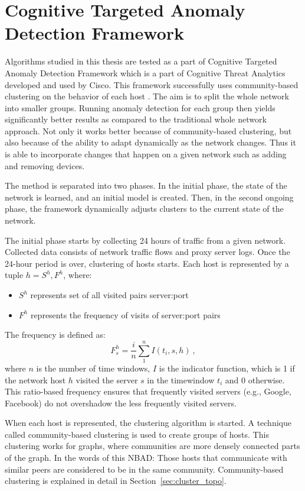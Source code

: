 \documentclass[thesis=B,english]{FITthesis}[2012/10/20]
\begin{document}
\section{Cognitive Targeted Anomaly Detection Framework}\label{sec:ctadf}

Algorithms studied in this thesis are tested as a part of Cognitive Targeted Anomaly Detection Framework which is a part of Cognitive Threat Analytics developed and used by Cisco.
This framework successfully uses community-based clustering on the behavior of each host \cite{kopp2018community}.
The aim is to split the whole network into smaller groups.
Running anomaly detection for each group then yields significantly better results as compared to the traditional whole network approach.
Not only it works better because of community-based clustering, but also because of the ability to adapt dynamically as the network changes.
Thus it is able to incorporate changes that happen on a given network such as adding and removing devices.

The method is separated into two phases.
In the initial phase, the state of the network is learned, and an initial model is created.
Then, in the second ongoing phase, the framework dynamically adjusts clusters to the current state of the network.

The initial phase starts by collecting 24 hours of traffic from a given network.
Collected data consists of network traffic flows and proxy server logs.
Once the 24-hour period is over, clustering of hosts starts.
Each host is represented by a tuple $h = {S^h, F^h}$, where:
\begin{itemize}
    \item $S^h$ represents set of all visited pairs server:port
    \item $F^h$ represents the frequency of visits of server:port pairs
\end{itemize}
The frequency is defined as:
\begin{equation}
F_s^h = \frac{i}{n}\sum\limits_{1}^{n}I(t_i, s, h)\:, \tag{1}
\end{equation}
where $n$ is the number of time windows, $I$ is the indicator function, which is 1 if the network host $h$ visited the server $s$ in the timewindow $t_i$ and 0 otherwise.
This ratio-based frequency ensures that frequently visited servers (e.g., Google, Facebook) do not overshadow the less frequently visited servers.

When each host is represented, the clustering algorithm is started.
A technique called community-based clustering is used to create groups of hosts.
This clustering works for graphs, where communities are more densely connected parts of the graph.
In the words of this NBAD: Those hosts that communicate with similar peers are considered to be in the same community.
Community-based clustering is explained in detail in Section~\ref{sec:cluster_topo}.
\end{document}
